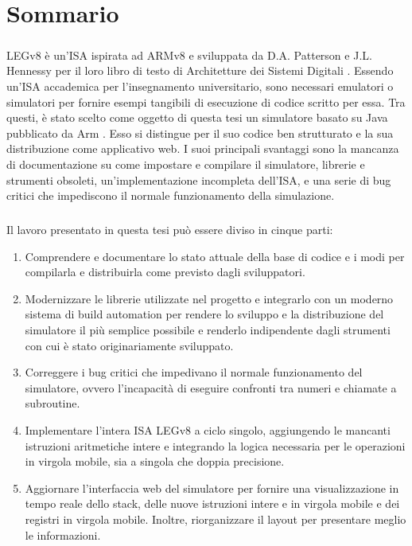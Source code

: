 \chapter{Sommario}\label{chap:somm}
\paragraph{}
LEGv8 è un'ISA ispirata ad ARMv8 e sviluppata da D.A. Patterson e J.L. Hennessy per il loro libro di testo di Architetture dei Sistemi Digitali \cite{patterson2016computer}. Essendo un'ISA accademica per l'insegnamento universitario, sono necessari emulatori o simulatori per fornire esempi tangibili di esecuzione di codice scritto per essa.
Tra questi, è stato scelto come oggetto di questa tesi un simulatore basato su Java \cite{legv8simARMrepo} pubblicato da Arm \cite{armweb}. Esso si distingue per il suo codice ben strutturato e la sua distribuzione come applicativo web. I suoi principali svantaggi sono la mancanza di documentazione su come impostare e compilare il simulatore, librerie e strumenti obsoleti, un'implementazione incompleta dell'ISA, e una serie di bug critici che impediscono il normale funzionamento della simulazione.
\paragraph{}
Il lavoro presentato in questa tesi può essere diviso in cinque parti:
\begin{enumerate}
    \item Comprendere e documentare lo stato attuale della base di codice e i modi per compilarla e distribuirla come previsto dagli sviluppatori.
    \item Modernizzare le librerie utilizzate nel progetto e integrarlo con un moderno sistema di build automation \cite{mavenweb} per rendere lo sviluppo e la distribuzione del simulatore il più semplice possibile e renderlo indipendente dagli strumenti con cui è stato originariamente sviluppato.
    \item Correggere i bug critici che impedivano il normale funzionamento del simulatore, ovvero l'incapacità di eseguire confronti tra numeri e chiamate a subroutine.
    \item Implementare l'intera ISA LEGv8 a ciclo singolo, aggiungendo le mancanti istruzioni aritmetiche intere e integrando la logica necessaria per le operazioni in virgola mobile, sia a singola che doppia precisione.
    \item Aggiornare l'interfaccia web del simulatore per fornire una visualizzazione in tempo reale dello stack, delle nuove istruzioni intere e in virgola mobile e dei registri in virgola mobile. Inoltre, riorganizzare il layout per presentare meglio le informazioni.
\end{enumerate}


